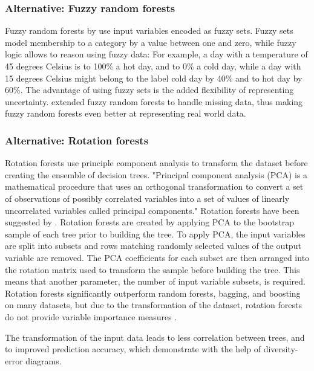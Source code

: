 \documentclass[a4paper,man,12pt,apacite,floatsintext]{apa6} %
\begin{document}
\subsubsection{Alternative: Fuzzy random forests}
Fuzzy random forests by  use input variables
encoded as fuzzy sets.
Fuzzy sets \cite{wpFS} model membership to a category by a value between
one and zero, while fuzzy logic \cite{wpFL} allows to reason using fuzzy data:
For example, a day with a temperature of 45 degrees Celsius is to 100\% a
hot day, and to 0\% a cold day, while a day with 15 degrees Celsius might
belong to the label cold day by 40\% and to hot day by 60\%.
The advantage of using fuzzy sets is the added flexibility of representing
uncertainty.
 extended fuzzy random forests to handle
missing data, thus making fuzzy random forests even better at representing
real world data.

\subsubsection{Alternative: Rotation forests}
Rotation forests use principle component analysis to transform
the dataset before creating the ensemble of decision trees.
"Principal component analysis (PCA) is a mathematical procedure that uses
an orthogonal transformation to convert a set of observations of possibly
correlated variables into a set of values of linearly uncorrelated variables
called principal components." \cite{wpPCA}
Rotation forests have been suggested by .
Rotation forests are created by applying PCA
to the bootstrap sample of each tree prior to building the tree.
To apply PCA, the input variables are split into subsets and rows matching
randomly selected values of the output variable are removed.
The PCA coefficients for each subset are then arranged into the rotation matrix
used to transform the sample before building the tree.
This means that another parameter, the number of input variable subsets, is required.
Rotation forests significantly outperform random forests, bagging, and
boosting on many datasets, but due to the transformation of the dataset,
rotation forests do not provide variable importance measures \cite{rodriguez2006rotation}.

The transformation of the input data leads to less correlation between trees,
and to improved prediction accuracy, which 
demonstrate with the help of diversity-error diagrams.
\end{document}
